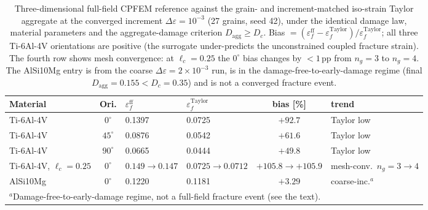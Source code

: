 \documentclass[11pt,a4paper,twocolumn]{article}
\providecommand{\ang}[1]{\ensuremath{#1^{\circ}}}
\begin{document}
\begin{table}[htbp]
\centering
\caption{Three-dimensional full-field CPFEM reference against the grain- and increment-matched
iso-strain Taylor aggregate at the converged increment $\Delta\varepsilon=10^{-3}$ (27 grains, seed 42),
under the identical damage law, material parameters and the aggregate-damage criterion
$D_{\mathrm{agg}}\ge D_c$. Bias $=(\varepsilon_f^{\mathrm{ff}} -
\varepsilon_f^{\mathrm{Taylor}})/\varepsilon_f^{\mathrm{Taylor}}$; all three Ti-6Al-4V orientations are
positive (the surrogate under-predicts the unconstrained coupled fracture strain). The fourth row shows
mesh convergence: at $\ell_c=0.25$ the $\ang{0}$ bias changes by $<1$\,pp from $n_g=3$ to $n_g=4$. The
AlSi10Mg entry is from the coarse $\Delta\varepsilon=2\times10^{-3}$ run, is in the
damage-free-to-early-damage regime (final $D_{\mathrm{agg}} = 0.155 < D_c = 0.35$) and is not a converged
fracture event.}
\label{tab:ff3d_orientations}
\footnotesize
\setlength{\tabcolsep}{4pt}
\begin{tabular}{p{}cp{}p{}cp{}}
\toprule
\textbf{Material} & \textbf{Ori.} & \textbf{$\varepsilon_f^{\mathrm{ff}}$} & \textbf{$\varepsilon_f^{\mathrm{Taylor}}$} & \textbf{bias [\%]} & \textbf{trend} \\
\midrule
Ti-6Al-4V & $\ang{0}$ & 0.1397 & 0.0725 & $+92.7$ & Taylor low \\
Ti-6Al-4V & $\ang{45}$ & 0.0876 & 0.0542 & $+61.6$ & Taylor low \\
Ti-6Al-4V & $\ang{90}$ & 0.0665 & 0.0444 & $+49.8$ & Taylor low \\
Ti-6Al-4V, $\ell_c{=}0.25$ & $\ang{0}$ & $0.149\to0.147$ & $0.0725\to0.0712$ & $+105.8\to+105.9$ & mesh-conv.\ $n_g{=}3\to4$ \\
AlSi10Mg & $\ang{0}$ & 0.1220 & 0.1181 & $+3.29$ & coarse-inc.$^{a}$ \\
\bottomrule
\multicolumn{6}{p{0.97\textwidth}}{\footnotesize $^{a}$Damage-free-to-early-damage regime, not a
full-field fracture event (see the text).}
\end{tabular}
\end{table}
\end{document}
